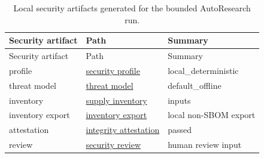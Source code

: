 \documentclass[
]{article}
\begin{document}
\begin{longtable}[]{@{}
  >{\raggedright\arraybackslash}p{}
  >{\raggedright\arraybackslash}p{}
  >{\raggedright\arraybackslash}p{}@{}}
\caption{Local security artifacts generated for the bounded AutoResearch
run.}\label{tbl:security-artifacts}\tabularnewline
\toprule\noalign{}
\begin{minipage}[b]{\linewidth}\raggedright
Security artifact
\end{minipage} & \begin{minipage}[b]{\linewidth}\raggedright
Path
\end{minipage} & \begin{minipage}[b]{\linewidth}\raggedright
Summary
\end{minipage} \\
\midrule\noalign{}
\endfirsthead
\toprule\noalign{}
\begin{minipage}[b]{\linewidth}\raggedright
Security artifact
\end{minipage} & \begin{minipage}[b]{\linewidth}\raggedright
Path
\end{minipage} & \begin{minipage}[b]{\linewidth}\raggedright
Summary
\end{minipage} \\
\midrule\noalign{}
\endhead
\bottomrule\noalign{}
\endlastfoot
profile & \href{../data/autoresearch_security_profile.json}{security
profile} & local\_deterministic \\
threat model & \href{../data/autoresearch_threat_model.json}{threat
model} & default\_offline \\
inventory &
\href{../data/autoresearch_supply_chain_inventory.json}{supply
inventory} & 14 inputs \\
inventory export &
\href{../data/autoresearch_inventory_export.json}{inventory export} &
local non-SBOM export \\
attestation &
\href{../data/autoresearch_integrity_attestation.json}{integrity
attestation} & passed \\
review & \href{../reports/autoresearch_security_review.md}{security
review} & human review input \\
\end{longtable}

\begingroup\footnotesize
\end{document}
